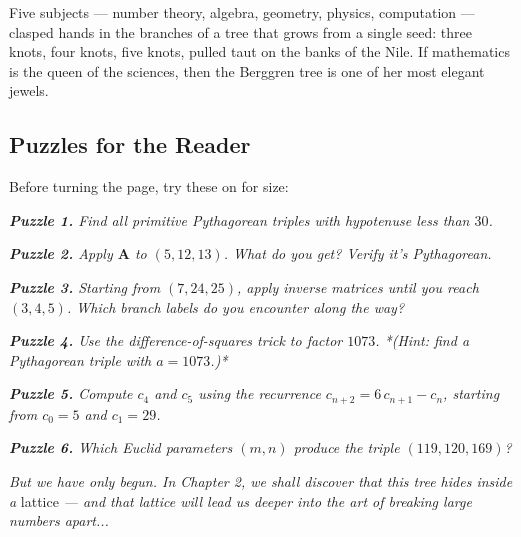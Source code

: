 \documentclass[11pt,openright,twoside]{book}
\renewenvironment{quotation}{%
  \par\vspace{8pt}%
  \begin{list}{}{%
    \setlength{\leftmargin}{2em}%
    \setlength{\rightmargin}{2em}%
  }\item[]\itshape\color{pullquote}%
}{%
  \end{list}%
  \par\vspace{8pt}%
}
\theoremstyle{definition}
\begin{document}
Five subjects --- number theory, algebra, geometry, physics, computation --- clasped hands in the branches of a tree that grows from a single seed: three knots, four knots, five knots, pulled taut on the banks of the Nile. If mathematics is the queen of the sciences, then the Berggren tree is one of her most elegant jewels.


\bigskip


\subsection{Puzzles for the Reader}

Before turning the page, try these on for size:

\begin{quotation}
\noindent\itshape \textbf{Puzzle 1.} Find all primitive Pythagorean triples with hypotenuse less than $30$.
\end{quotation}

\begin{quotation}
\noindent\itshape \textbf{Puzzle 2.} Apply $\mathbf{A}$ to $(5, 12, 13)$. What do you get? Verify it's Pythagorean.
\end{quotation}

\begin{quotation}
\noindent\itshape \textbf{Puzzle 3.} Starting from $(7, 24, 25)$, apply inverse matrices until you reach $(3, 4, 5)$. Which branch labels do you encounter along the way?
\end{quotation}

\begin{quotation}
\noindent\itshape \textbf{Puzzle 4.} Use the difference-of-squares trick to factor $1073$. *(Hint: find a Pythagorean triple with $a = 1073$.)*
\end{quotation}

\begin{quotation}
\noindent\itshape \textbf{Puzzle 5.} Compute $c_4$ and $c_5$ using the recurrence $c_{n+2} = 6\,c_{n+1} - c_n$, starting from $c_0 = 5$ and $c_1 = 29$.
\end{quotation}

\begin{quotation}
\noindent\itshape \textbf{Puzzle 6.} Which Euclid parameters $(m, n)$ produce the triple $(119, 120, 169)$?
\end{quotation}


\bigskip


\textit{But we have only begun. In Chapter 2, we shall discover that this tree hides inside a} lattice \textit{--- and that lattice will lead us deeper into the art of breaking large numbers apart...}
\end{document}
